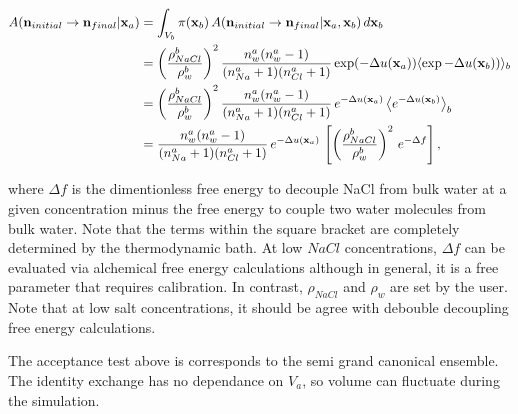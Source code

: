 \documentclass[11pt]{article} %
\begin{document}
\begin{align}
A(\mathbf{n}_{initial} \rightarrow \mathbf{n}_{final}|\mathbf{x}_a)  &= \int_{V_b} \pi(\mathbf{x}_b)\, A(\mathbf{n}_{initial} \rightarrow \mathbf{n}_{final}|\mathbf{x}_a,\mathbf{x}_b) \, d\mathbf{x}_b \notag\\
&= \left(\frac{\rho_{NaCl}^b}{\rho_w^b}\right)^2\frac{n_w^a(n_w^a - 1)}{(n^a_{Na} + 1)(n^a_{Cl} + 1)}\exp(-\Delta u(\mathbf{x}_a))\langle \exp-\Delta u(\mathbf{x}_b)) \rangle_b \notag\\
&= \left(\frac{\rho_{NaCl}^b}{\rho_w^b}\right)^2\frac{n_w^a(n_w^a - 1)}{(n^a_{Na} + 1)(n^a_{Cl} + 1)} \, e^{-\Delta u(\mathbf{x}_a)}\,\big\langle e^{-\Delta u(\mathbf{x}_b)} \big\rangle_b \notag\\ 
&= \frac{n_w^a(n_w^a - 1)}{(n^a_{Na} + 1)(n^a_{Cl} + 1)} \, e^{-\Delta u(\mathbf{x}_a)} \, \left[ \left(\frac{\rho_{NaCl}^b}{\rho_w^b}\right)^2 \, e^{-\Delta f} \right],
\end{align}

where $\Delta f$ is the dimentionless free energy to decouple NaCl from bulk water at a given concentration minus the free energy to couple two water molecules from bulk water. Note that the terms within the square bracket are completely determined by the thermodynamic bath. At low $NaCl$ concentrations, $\Delta f$ can be evaluated via alchemical free energy calculations although in general, it is a free parameter that requires calibration. In contrast, $\rho_{NaCl}$ and $\rho_{w}$ are set by the user. Note that at low salt concentrations, it should be agree with debouble decoupling free energy calculations.

The acceptance test above is corresponds to the semi grand canonical ensemble. The identity exchange has no dependance on $V_a$, so volume can fluctuate during the simulation.
\end{document}
